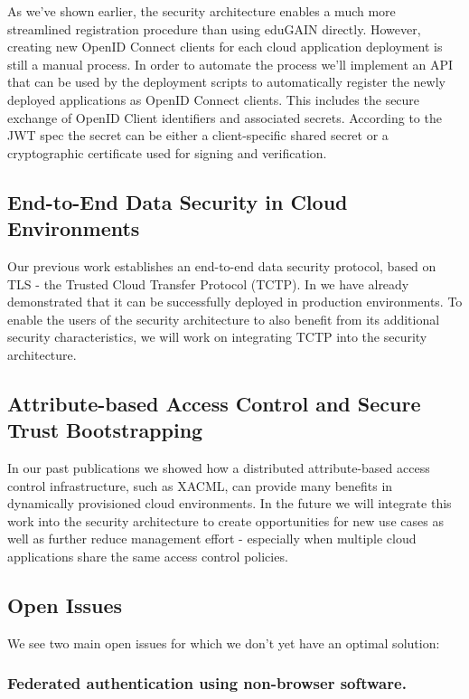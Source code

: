\documentclass{llncs}
\begin{document}
As we've shown earlier, the security architecture enables a much more streamlined registration procedure than using eduGAIN directly. However, creating new OpenID Connect clients for each cloud application deployment is still a manual process. In order to automate the process we'll implement an API that can be used by the deployment scripts to automatically register the newly deployed applications as OpenID Connect clients. This includes the secure exchange of OpenID Client identifiers and associated secrets. According to the JWT spec the secret can be either a client-specific shared secret or a cryptographic certificate used for signing and verification.

\subsection{End-to-End Data Security in Cloud Environments}

Our previous work \cite{S13d} establishes an end-to-end data security protocol, based on TLS - the Trusted Cloud Transfer Protocol (TCTP). In \cite{SERKZ14} we have already demonstrated that it can be successfully deployed in production environments. To enable the users of the security architecture to also benefit from its additional security characteristics, we will work on integrating TCTP into the security architecture.

\subsection{Attribute-based Access Control and Secure Trust Bootstrapping}

In our past publications \cite{DLLG10,NMDL12} we showed how a distributed attribute-based access control infrastructure, such as XACML, can provide many benefits in dynamically provisioned cloud environments. In the future we will integrate this work into the security architecture to create opportunities for new use cases as well as further reduce management effort - especially when multiple cloud applications share the same access control policies.

\subsection{Open Issues}

We see two main open issues for which we don't yet have an optimal solution:

\subsubsection{Federated authentication using non-browser software.}
\end{document}
